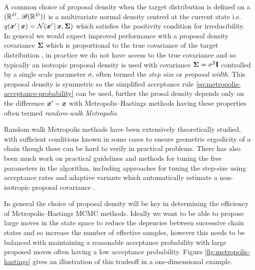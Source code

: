 A common choice of proposal density when the target distribution is defined on a $(\mathbb{R}^D, \, \mathscr{B}(\mathbb{R}^D))$ is a multivariate normal density centred at the current state i.e. $q(\vct{x}'\gvn\vct{x}) = \nrm{\vct{x}' \gvn \vct{x}, \mtx{\Sigma}}$ which satisfies the positivity condition for irreducibility. In general we would expect improved performance with a proposal density covariance $\boldsymbol{\Sigma}$ which is proportional to the true covariance of the target distribution \citep{rosenthal2011optimal}, in practice we do not have access to the true covariance and so typically an isotropic proposal density is used with covariance $\boldsymbol{\Sigma} = \sigma^2\mathbf{I}$ controlled by a single scale parameter $\sigma$, often termed the \emph{step size} or \emph{proposal width}. This proposal density is symmetric so the simplified acceptance rule \eqref{eq:metropolis-acceptance-probability} can be used, further the prosal density depends only on the difference $\boldsymbol{x}' - \boldsymbol{x}$ with Metropolis--Hastings methods having these properties often termed \emph{random-walk Metropolis}. 

Random walk Metropolis methods have been extensively theoretically studied, with sufficient conditions known in some cases to ensure geometric ergodicity of a chain \citep{mengersen1996rates,roberts1996geometric} though these can be hard to verify in practical problems. There has also been much work on practical guidelines and methods for tuning the free parameters in the algorithm, including approaches for tuning the step-size using acceptance rates \citep{gelman1997weak,roberts2001optimal} and adaptive variants which automatically estimate a non- isotropic proposal covariance \citep{haario2001adaptive,rosenthal2011optimal}.

In general the choice of proposal density will be key in determining the efficiency of Metropolis--Hastings \ac{MCMC} methods. Ideally we want to be able to propose large moves in the state space to reduce the depencies between successive chain states and so increase the number of effective samples, however this needs to be balanced with maintaining a reasonable acceptance probability with large proposed moves often having a low acceptance probability. Figure \ref{fig:metropolis-hastings} gives an illustration of this tradeoff in a one-dimensional example. 

